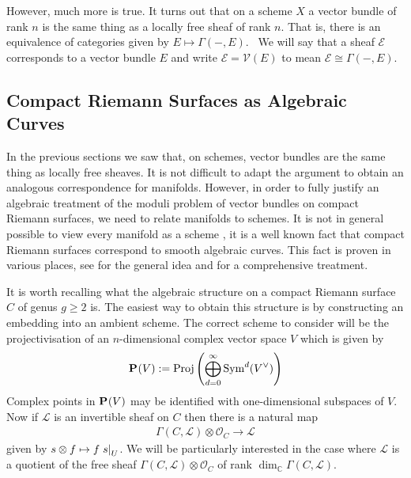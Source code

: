 \documentclass[12pt]{ociamthesis}  %
\begin{document}
However, much more is true. It turns out that on a scheme $X$
a vector bundle of rank $n$ is the same thing as a locally
free sheaf of rank $n$. That is, there is an equivalence
of categories given by $E \mapsto \Gamma(-,E)$.~\cite[128-129]{hartshorne1977}
We will say that a sheaf $\mathscr E$ corresponds to a vector bundle
$E$ and write $\mathscr E=\mathcal V(E)$ to mean
$\mathscr E\cong\Gamma(-,E)$.

\subsection{Compact Riemann Surfaces as Algebraic Curves}
\label{sec:surfaces_as_curves}

In the previous sections we saw that, on schemes, vector bundles are
the same thing as locally free sheaves. It is not difficult to adapt
the argument to obtain an analogous correspondence for manifolds.
However, in order to fully justify an algebraic treatment of the
moduli problem of vector bundles on compact Riemann surfaces, we
need to relate manifolds to schemes. It is not in general possible
to view every manifold as a scheme \missingcitation, it is a well
known fact that compact Riemann surfaces correspond to smooth
algebraic curves.
This fact is proven in various places, see \cite[215]{griffiths1994}
for the general idea and \cite[5-16]{harris2011}
for a comprehensive treatment.

It is worth recalling what the algebraic structure on a compact
Riemann surface $C$ of genus $g\geq 2$ is. The easiest way to obtain
this structure is by constructing an embedding into an ambient
scheme. The correct scheme to consider will be the projectivisation
of an $n$-dimensional complex vector space $V$ which is given
by
\begin{align*}
  \mathbf{P}^{}_{}(V) := \operatorname{Proj}\left({
        \bigoplus_{d=0}^\infty \operatorname{Sym}^d(V^\vee)
      }\right)
\end{align*}
Complex points in $\mathbf{P}^{}_{}(V)$ may be identified
with one-dimensional subspaces of $V$. \missingcitation
Now if $\mathscr L$ is
an invertible sheaf on $C$ then there is a natural map
\begin{align}\label{eq:natural_line_bundle_map}
  \Gamma(C,\mathscr L)\otimes\mathscr O_C \to \mathscr L
\end{align}
given by $s\otimes f \mapsto f\left.{s}\right\vert_{U}$. We will be
particularly interested in the case where $\mathscr L$ is a
quotient of the free sheaf
$\Gamma(C,\mathscr L)\otimes\mathscr O_C$ of rank
$\dim_{\mathbb C} \Gamma(C,\mathscr L)$.
\end{document}
